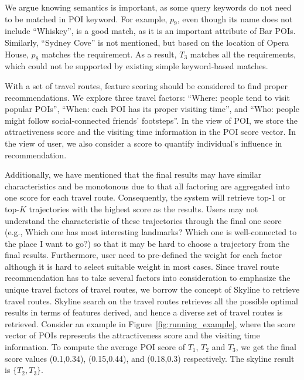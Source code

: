We argue knowing semantics is important, as some query keywords do not need to be matched in POI keyword. For example, $p_9$, even though its name does not include ``Whiskey'', is a good match, as it is an important attribute of Bar POIs.  Similarly, ``Sydney Cove'' is not mentioned, but based on the location of Opera House, $p_8$ matches the requirement. As a result, $T_3$ matches all the requirements, which could not be supported by existing simple keyword-based matches.%

With a set of travel routes, feature scoring should be considered to find proper recommendations. We explore three travel factors: ``Where: people tend to visit popular POIs'', ``When: each POI has its proper visiting time'', and ``Who: people might follow social-connected friends' footsteps''. In the view of POI, we store the attractiveness score and the visiting time information in the POI score vector. In the view of user, we also consider a score to quantify individual's influence in recommendation.

Additionally, we have mentioned that the final results may have similar characteristics and be monotonous due to that all factoring are aggregated into one score for each travel route. Consequently, the system will retrieve top-1 or top-$K$ trajectories with the highest score as the results. Users may not understand the characteristic of these trajectories through the final one score (e.g., Which one has most interesting landmarks? Which one is well-connected to the place I want to go?) so that it may be hard to choose a trajectory from the final results. Furthermore, user need to pre-defined the weight for each factor although it is hard to select suitable weight in most cases. Since travel route recommendation has to take several factors into consideration to emphasize the unique travel factors of travel routes, we borrow the concept of Skyline to retrieve travel routes. Skyline search on the travel routes retrieves all the possible optimal results in terms of features derived, and hence a diverse set of travel routes is retrieved. Consider an example in Figure~\ref{fig:running_example}, where the score vector of POIs represents the attractiveness score and the visiting time information. To compute the average POI score of $T_1$, $T_2$ and $T_3$, we get the final score values (0.1,0.34), (0.15,0.44), and (0.18,0.3) respectively. The skyline result is $\{T_2,T_3\}$. 

